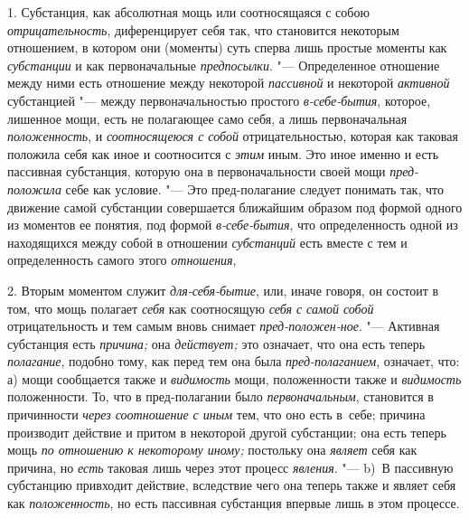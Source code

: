 1. Субстанция, как абсолютная мощь или соотносящаяся с собою {\em отрицательность},
диференцирует себя так, что становится некоторым отношением,
в котором они (моменты) суть сперва лишь простые моменты как
{\em субстанции} и как первоначальные {\em предпосылки}. "---
Определенное отношение между ними есть отношение между некоторой {\em пассивной}
и некоторой {\em активной} субстанцией "--- между первоначальностью простого
{\em в-себе-бытия}, которое, лишенное мощи, есть не полагающее само себя,
а лишь первоначальная {\em положенность}, и {\em соотносящеюся с собой}
отрицательностью, которая как таковая положила себя как иное и соотносится с
{\em этим} иным. Это иное именно и есть пассивная субстанция, которую она в
первоначальности своей мощи {\em пред-положила} себе как условие. "--- Это
пред-полагание следует понимать так, что движение самой субстанции
совершается ближайшим образом под формой одного из моментов ее понятия, под
формой {\em в-себе-бытия}, что определенность одной из находящихся между
собой в отношении {\em субстанций} есть вместе с тем и определенность самого
этого {\em отношения},

2. Вторым моментом служит {\em для-себя-бытие}, или, иначе говоря, он
состоит в том, что мощь полагает {\em себя} как соотносящую {\em себя с
самой собой} отрицательность и тем самым вновь снимает
{\em пред-положен-ное}. "--- Активная субстанция есть {\em причина;} она
{\em действует;} это означает, что она есть теперь {\em полагание}, подобно
тому, как перед тем она была {\em пред-полаганием}, означает, что: а) мощи
сообщается также и {\em видимость} мощи, положенности также и {\em видимость}
положенности. То, что в пред-полагании было {\em первоначальным}, становится
в причинности {\em через соотношение с иным} тем, что оно есть в~себе;
причина производит действие и притом в некоторой другой субстанции; она есть
теперь мощь {\em по отношению к некоторому иному;} постольку она {\em являет}
себя как причина, но {\em есть} таковая лишь через этот процесс {\em явления}.
"--- b)~В пассивную субстанцию привходит действие, вследствие чего она теперь
также и являет себя как {\em положенность}, но есть пассивная субстанция
впервые лишь в этом процессе.

